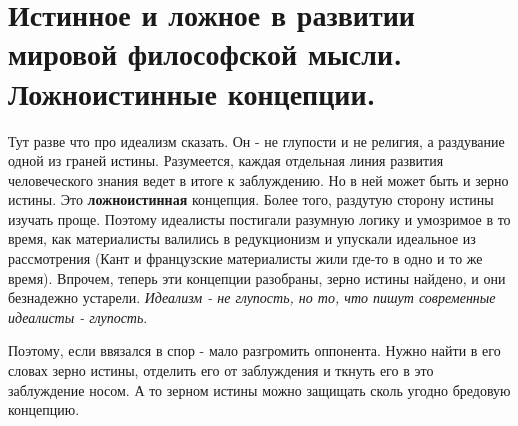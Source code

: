 \section{ Истинное и ложное в развитии мировой философской мысли. Ложноистинные концепции.}
Тут разве что про идеализм сказать. Он - не глупости и не религия, а раздувание одной из граней истины. Разумеется, каждая отдельная линия развития человеческого знания ведет в итоге к заблуждению. Но в ней может быть и зерно истины. Это \textbf{ложноистинная} концепция. Более того, раздутую сторону истины изучать проще. Поэтому идеалисты постигали разумную логику и умозримое в то время, как материалисты валились в редукционизм и упускали идеальное из рассмотрения (Кант и французские материалисты жили где-то в одно и то же время). Впрочем, теперь эти концепции разобраны, зерно истины найдено,  и они безнадежно устарели. \textit{Идеализм - не глупость, но то, что пишут современные идеалисты - глупость}.

Поэтому, если ввязался в спор -  мало разгромить оппонента. Нужно найти в его словах зерно истины, отделить его от заблуждения и ткнуть его в это заблуждение носом. А то зерном истины можно защищать сколь угодно бредовую концепцию.
 